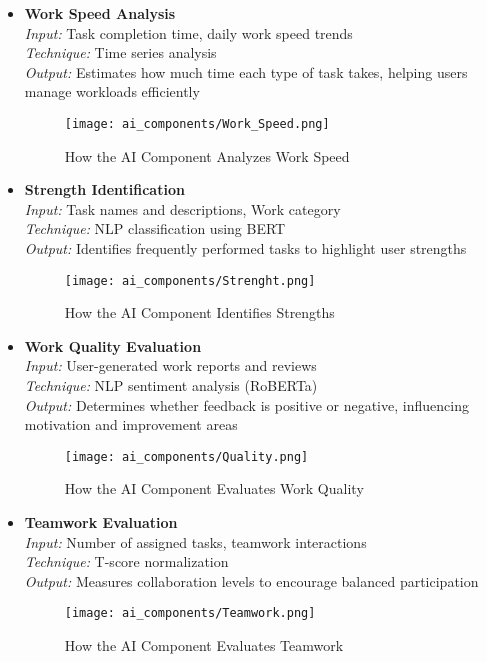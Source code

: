 \begin{itemize}
    \item \textbf{Work Speed Analysis} 
    \\ \textit{Input:} Task completion time, daily work speed trends  
    \\ \textit{Technique:} Time series analysis  
    \\ \textit{Output:} Estimates how much time each type of task takes, helping users manage workloads efficiently  
    \begin{figure}[H]
        \centering
        \texttt{[image: ai\_components/Work\_Speed.png]}
        \caption{How the AI Component Analyzes Work Speed}
    \end{figure}

    \item \textbf{Strength Identification}  
    \\ \textit{Input:} Task names and descriptions, Work category  
    \\ \textit{Technique:} NLP classification using BERT  
    \\ \textit{Output:} Identifies frequently performed tasks to highlight user strengths  
    \begin{figure}[H]
        \centering
        \texttt{[image: ai\_components/Strenght.png]}
        \caption{How the AI Component Identifies Strengths}
    \end{figure}

    \item \textbf{Work Quality Evaluation}  
    \\ \textit{Input:} User-generated work reports and reviews  
    \\ \textit{Technique:} NLP sentiment analysis (RoBERTa)  
    \\ \textit{Output:} Determines whether feedback is positive or negative, influencing motivation and improvement areas  
    \begin{figure}[H]
        \centering
        \texttt{[image: ai\_components/Quality.png]}
        \caption{How the AI Component Evaluates Work Quality}
    \end{figure}
   

    \item \textbf{Teamwork Evaluation}  
    \\ \textit{Input:} Number of assigned tasks, teamwork interactions  
    \\ \textit{Technique:} T-score normalization  
    \\ \textit{Output:} Measures collaboration levels to encourage balanced participation  
    \begin{figure}[H]
        \centering
        \texttt{[image: ai\_components/Teamwork.png]}
        \caption{How the AI Component Evaluates Teamwork}
    \end{figure}


\end{itemize}
